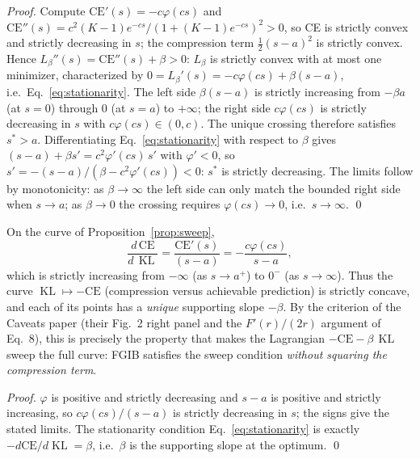 \begin{proof}
Compute $\mathrm{CE}'(s) = -c\varphi(cs)$ and
$\mathrm{CE}''(s) = c^2 (K-1) e^{-cs}/(1 + (K-1)e^{-cs})^2 > 0$, so CE is strictly convex
and strictly decreasing in $s$; the compression term $\tfrac{1}{2}(s-a)^2$ is strictly
convex. Hence $L_\beta''(s) = \mathrm{CE}''(s) + \beta > 0$: $L_\beta$ is strictly convex
with at most one minimizer, characterized by
$0 = L_\beta'(s) = -c\varphi(cs) + \beta(s-a)$, i.e.\ Eq.~\eqref{eq:stationarity}.
The left side $\beta(s-a)$ is strictly increasing from $-\beta a$ (at $s=0$) through $0$
(at $s=a$) to $+\infty$; the right side $c\varphi(cs)$ is strictly decreasing in $s$ with
$c\varphi(cs) \in (0, c)$. The unique crossing therefore satisfies $s^* > a$.
Differentiating Eq.~\eqref{eq:stationarity} with respect to $\beta$ gives
$(s-a) + \beta s' = c^2\varphi'(cs)\,s'$ with $\varphi' < 0$, so
$s' = -(s-a)/(\beta - c^2\varphi'(cs)) < 0$: $s^*$ is strictly decreasing.
The limits follow by monotonicity: as $\beta \to \infty$ the left side can only match the
bounded right side when $s \to a$; as $\beta \to 0$ the crossing requires $\varphi(cs)\to 0$,
i.e.\ $s \to \infty$. \hfill\qed
\end{proof}

\begin{proposition}\label{prop:curve}
On the curve of Proposition~\ref{prop:sweep},
\begin{equation}
\frac{d\,\mathrm{CE}}{d\,\operatorname{KL}}
= \frac{\mathrm{CE}'(s)}{(s-a)}
= -\frac{c\varphi(cs)}{s-a},
\label{eq:slope}
\end{equation}
which is strictly increasing from $-\infty$ (as $s \to a^+$) to $0^-$ (as $s \to \infty$).
Thus the curve $\operatorname{KL} \mapsto -\mathrm{CE}$ (compression versus achievable
prediction) is strictly concave, and each of its points has a \emph{unique} supporting slope
$-\beta$. By the criterion of the Caveats paper (their Fig.~2 right panel and the
$F'(r)/(2r)$ argument of Eq.~8), this is precisely the property that makes the Lagrangian
$-\mathrm{CE} - \beta\,\operatorname{KL}$ sweep the full curve: FGIB satisfies the
sweep condition \emph{without squaring the compression term}.
\end{proposition}

\begin{proof}
$\varphi$ is positive and strictly decreasing and $s-a$ is positive and strictly increasing,
so $c\varphi(cs)/(s-a)$ is strictly decreasing in $s$; the signs give the stated limits.
The stationarity condition Eq.~\eqref{eq:stationarity} is exactly
$-d\mathrm{CE}/d\operatorname{KL} = \beta$, i.e.\ $\beta$ is the supporting slope at the
optimum. \hfill\qed
\end{proof}

